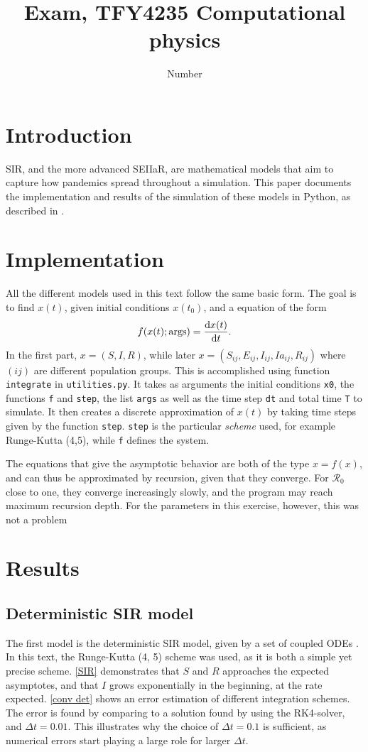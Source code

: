 \documentclass{article}
\title{Exam, TFY4235 Computational physics}
\author{Number}
\date{}
\begin{document}
    \maketitle
    \section*{Introduction}
    SIR, and the more advanced SEIIaR, are mathematical models that aim to capture how pandemics spread throughout a simulation.
    This paper documents the implementation and results of the simulation of these models in Python, as described in \cite{exam}.

    \section*{Implementation}
    All the different models used in this text follow the same basic form. 
    The goal is to find $x(t)$, given initial conditions $x(t_0)$, and a equation of the form
    \begin{equation*}
        f(x(t); \mathrm{args}) = \dv{x(t)}{t}.
    \end{equation*}
    In the first part, $x = (S, I, R)$, while later $x = (S_{ij}, E_{ij}, I_{ij}, Ia_{ij}, R_{ij})$ where $(ij)$ are different population groups. 
    This is accomplished using function \verb|integrate| in \verb|utilities.py|. 
    It takes as arguments the initial conditions \verb|x0|, the functions \verb|f| and \verb|step|, the list \verb|args| as well as the time step \verb|dt| and total time \verb|T| to simulate. 
    It then creates a discrete approximation of $x(t)$ by taking time steps given by the function \verb|step|. 
    \verb|step| is the particular \emph{scheme} used, for example Runge-Kutta (4,5), while \verb|f| defines the system. 


    The equations that give the asymptotic behavior are both of the type $x = f(x)$, and can thus be approximated by recursion, given that they converge. 
    For $\mathcal{R}_0$ close to one, they converge increasingly slowly, and the program may reach maximum recursion depth. 
    For the parameters in this exercise, however, this was not a problem

    \section*{Results}
    \subsection*{Deterministic SIR model}
    The first model is the deterministic SIR model, given by a set of coupled ODEs \cite{exam}. 
    In this text, the Runge-Kutta (4, 5) scheme was used, as it is both a simple yet precise scheme.
    \autoref{SIR} demonstrates that $S$ and $R$ approaches the expected asymptotes, and that $I$ grows exponentially in the beginning, at the rate expected.
    \autoref{conv det} shows an error estimation of different integration schemes.
    The error is found by comparing to a solution found by using the RK4-solver, and $\Delta t = 0.01$.
    This illustrates why the choice of $\Delta t = 0.1$ is sufficient, as numerical errors start playing a large role for larger $\Delta t$.
    
\end{document}
